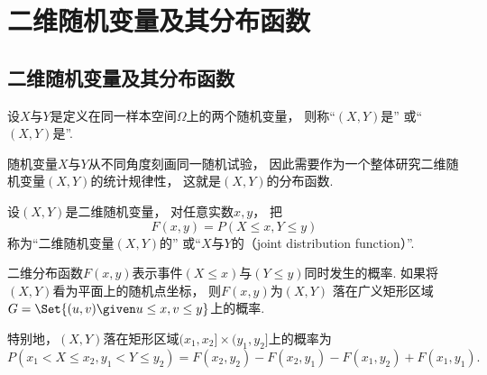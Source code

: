 \section{二维随机变量及其分布函数}
\subsection{二维随机变量及其分布函数}
\begin{definition}
设\(X\)与\(Y\)是定义在同一样本空间\(\Omega\)上的两个随机变量，
则称“\((X,Y)\)是”
或“\((X,Y)\)是”.
\end{definition}

随机变量\(X\)与\(Y\)从不同角度刻画同一随机试验，
因此需要作为一个整体研究二维随机变量\((X,Y)\)的统计规律性，
这就是\((X,Y)\)的分布函数.

\begin{definition}
设\((X,Y)\)是二维随机变量，
对任意实数\(x,y\)，
把\begin{equation}\label{equation:多维随机变量及其分布.二维分布函数的定义式}
	F(x,y) = P(X \leq x, Y \leq y)
\end{equation}
称为“二维随机变量\((X,Y)\)的”
或“\(X\)与\(Y\)的（joint distribution function）”.
\end{definition}
二维分布函数\(F(x,y)\)表示事件\((X \leq x)\)与\((Y \leq y)\)同时发生的概率.
如果将\((X,Y)\)看为平面上的随机点坐标，
则\(F(x,y)\)为\((X,Y)\)
落在广义矩形区域\(G=\Set{(u,v) \given u \leq x, v \leq y}\)上的概率.

特别地，\((X,Y)\)落在矩形区域\((x_1,x_2]\times(y_1,y_2]\)上的概率为
\begin{equation}
	P(x_1 < X \leq x_2, y_1 < Y \leq y_2)
	= F(x_2,y_2) - F(x_2,y_1) - F(x_1,y_2) + F(x_1,y_1).
\end{equation}

